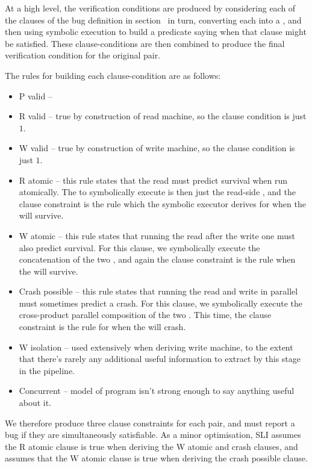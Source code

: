 At a high level, the verification conditions are produced by considering each of the clauses of the bug definition in section~ in turn, converting each into a \StateMachine, and then using symbolic execution to build a predicate saying when that clause might be satisfied.
These clause-conditions are then combined to produce the final verification condition for the original \StateMachine pair.

The rules for building each clause-condition are as follows:

\begin{itemize}
\item P valid -- 
\item R valid -- true by construction of read machine, so the clause condition is just $1$.
\item W valid -- true by construction of write machine, so the clause condition is just $1$.
\item
  R atomic -- this rule states that the read \StateMachine must predict survival when run atomically.
  The \StateMachine to symbolically execute is then just the read-side \StateMachine, and the clause constraint is the rule which the symbolic executor derives for when the \StateMachine will survive.
\item
  W atomic -- this rule states that running the read \StateMachine after the write one must also predict survival.
  For this clause, we symbolically execute the concatenation of the two \StateMachines, and again the clause constraint is the rule when the \StateMachine will survive.
\item
  Crash possible -- this rule states that running the read and write \StateMachines in parallel must sometimes predict a crash.
  For this clause, we symbolically execute the cross-product parallel composition of the two \StateMachines.
  This time, the clause constraint is the rule for when the \StateMachine will crash.
\item
  W isolation -- used extensively when deriving write machine, to the extent that there's rarely any additional useful information to extract by this stage in the pipeline.
\item
  Concurrent -- model of program isn't strong enough to say anything useful about it.
\end{itemize}

We therefore produce three clause constraints for each \StateMachine pair, and must report a bug if they are simultaneously satisfiable.
As a minor optimisation, SLI assumes the R atomic clause is true when deriving the W atomic and crash clauses, and assumes that the W atomic clause is true when deriving the crash possible clause.

